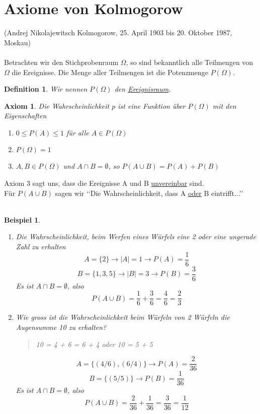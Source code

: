 \documentclass{report}
\newtheorem{mydef}{Definition}
\newtheorem{myexample}{Beispiel}
\newtheorem{axiom}{Axiom}
\begin{document}
\section{Axiome von Kolmogorow}
(Andrej Nikolajewitsch Kolmogorow, 25. April 1903 bis 20. Oktober 1987, Moskau)\\\\
Betrachten wir den Stichprobenraum $\Omega$, so sind bekanntlich alle Teilmengen von $\Omega$ die Ereignisse. Die Menge aller Teilmengen ist die Potenzmenge $P(\Omega)$.
\begin{mydef}
Wir nennen $P(\Omega)$ den \underline{Ereignisraum}.
\end{mydef}
\begin{axiom} Die Wahrscheinlichkeit $p$ ist eine Funktion über $P(\Omega)$ mit den Eigenschaften
\begin{enumerate}
\item $0 \leq P(A) \leq 1$ für alle $A \in P(\Omega)$
\item $P(\Omega) = 1$
\item $A, B \in P(\Omega)$ und $ A \cap B = \emptyset$, so $P(A \cup B) = P(A) + P(B)$
\end{enumerate}
\end{axiom}
Axiom 3 sagt uns, dass die Ereignisse A und B \underline{unvereinbar} sind.\\
Für $P(A \cup B)$ sagen wir \lq\lq{}Die Wahrscheinlichkeit, dass A \underline{oder} B eintrifft...\rq\rq{}\\\\
\begin{myexample}
\begin{enumerate}
\item
Die Wahrscheinlichkeit, beim Werfen eines Würfels eine 2 oder eine ungerade Zahl zu erhalten
\begin{equation}
A = \{2\} \longrightarrow |A| = 1 \longrightarrow P(A) = \frac{1}{6}
\end{equation}
\begin{equation}
B = \{1,3,5\} \longrightarrow |B| = 3 \longrightarrow P(B) = \frac{3}{6}
\end{equation}
Es ist $A \cap B = \emptyset$, also
\begin{equation}
P(A \cup B) = \frac{1}{6} + \frac{3}{6} = \frac{4}{6} = \frac{2}{3}
\end{equation}
\item
Wie gross ist die Wahrscheinlichkeit beim Würfeln von 2 Würfeln die Augensumme 10 zu erhalten?
\begin{quote}
10 = 4 + 6 = 6 + 4 oder 10 = 5 + 5
\end{quote}
\begin{equation}
A = \{(4/6), (6/4)\} \longrightarrow P(A) = \frac{2}{36}
\end{equation}
\begin{equation}
B = \{(5/5)\} \longrightarrow P(B) = \frac{1}{36}
\end{equation}
Es ist $A \cap B = \emptyset$, also
\begin{equation}
P(A \cup B) = \frac{2}{36} + \frac{1}{36} = \frac{3}{36} = \frac{1}{12}
\end{equation}
\end{enumerate}
\end{myexample}
\end{document}
